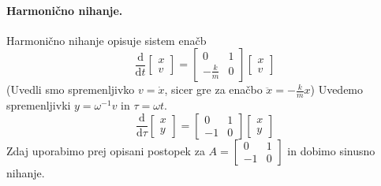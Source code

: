 \documentclass[a4paper]{article}
\newcommand{\dd}[2]{\frac{\mathrm{d} {#1}}{\mathrm{d} {#2}}}
\begin{document}
\paragraph{Harmonično nihanje.} Harmonično nihanje opisuje sistem enačb 
$$\dd{}{t}\begin{bmatrix}
    x \\ v
\end{bmatrix} = \begin{bmatrix}
    0 & 1 \\
    -\frac{k}{m} & 0
\end{bmatrix}\begin{bmatrix}
    x \\ v
\end{bmatrix}$$
(Uvedli smo spremenljivko $v = \dot{x}$, sicer gre za enačbo $\ddot{x} = -\frac{k}{m}x$)
Uvedemo spremenljivki $y = \omega^{-1} v$ in $\tau = \omega t$.
$$\dd{}{\tau}\begin{bmatrix}
    x \\ y
\end{bmatrix} = \begin{bmatrix}
    0 & 1 \\
    -1 & 0
\end{bmatrix}\begin{bmatrix}
    x \\ y
\end{bmatrix}$$
Zdaj uporabimo prej opisani postopek za $\displaystyle{A = \begin{bmatrix}
    0 & 1 \\
    -1 & 0
\end{bmatrix}}$ in dobimo sinusno nihanje.
\end{document}
